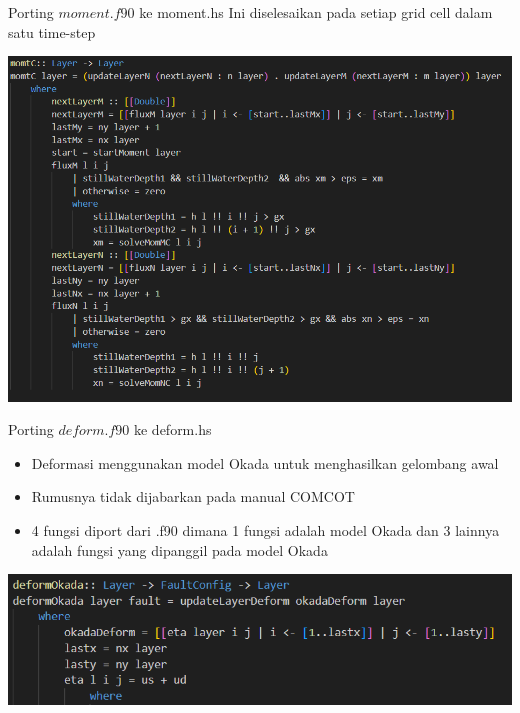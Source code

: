 \documentclass{beamer}
\begin{document}
\begin{frame}{Porting $moment.f90$ ke moment.hs}
    Ini diselesaikan pada setiap grid cell dalam satu time-step
    \begin{center}
        \includegraphics[scale=0.4]{figure/moment2.png}
    \end{center}
\end{frame}

\begin{frame}{Porting $deform.f90$ ke deform.hs}
    \begin{itemize}
        \item Deformasi menggunakan model Okada untuk menghasilkan gelombang awal
        \item Rumusnya tidak dijabarkan pada manual COMCOT
        \item 4 fungsi diport dari .f90 dimana 1 fungsi adalah model Okada dan
        3 lainnya adalah fungsi yang dipanggil pada model Okada
    \end{itemize}
    \begin{center}
        \includegraphics[scale=0.5]{figure/deform1.png}
    \end{center}
\end{frame}
\end{document}
